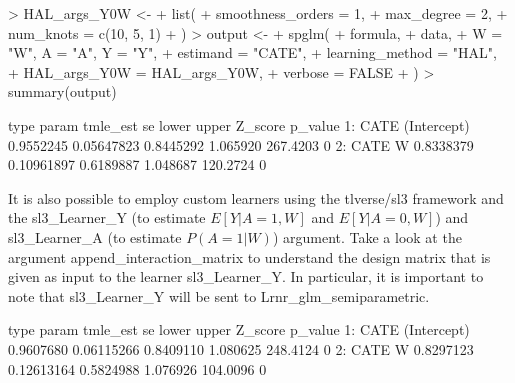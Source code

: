 \documentclass{article}
\begin{document}
\begin{Schunk}
\begin{Sinput}
> HAL_args_Y0W <-
+   list(
+     smoothness_orders = 1,
+     max_degree = 2,
+     num_knots = c(10, 5, 1)
+   )
> output <-
+   spglm(
+     formula,
+     data,
+     W = "W", A = "A", Y = "Y",
+     estimand = "CATE",
+     learning_method = "HAL",
+     HAL_args_Y0W = HAL_args_Y0W,
+     verbose = FALSE
+   )
> summary(output)
\end{Sinput}
\begin{Soutput}
   type       param  tmle_est         se     lower    upper  Z_score p_value
1: CATE (Intercept) 0.9552245 0.05647823 0.8445292 1.065920 267.4203       0
2: CATE           W 0.8338379 0.10961897 0.6189887 1.048687 120.2724       0
\end{Soutput}
\end{Schunk}

It is also possible to employ custom learners using the tlverse/sl3 framework and the sl3\_Learner\_Y (to estimate $E[Y|A=1,W]$ and $E[Y|A=0,W]$) and sl3\_Learner\_A (to estimate $P(A=1|W)$) argument.
Take a look at the argument append\_interaction\_matrix to understand the design matrix that is given as input to the learner sl3\_Learner\_Y. In particular, it is important to note that sl3\_Learner\_Y will be sent to Lrnr\_glm\_semiparametric.

\begin{Schunk}
\begin{Soutput}
   type       param  tmle_est         se     lower    upper  Z_score p_value
1: CATE (Intercept) 0.9607680 0.06115266 0.8409110 1.080625 248.4124       0
2: CATE           W 0.8297123 0.12613164 0.5824988 1.076926 104.0096       0
\end{Soutput}
\end{Schunk}
\end{document}

